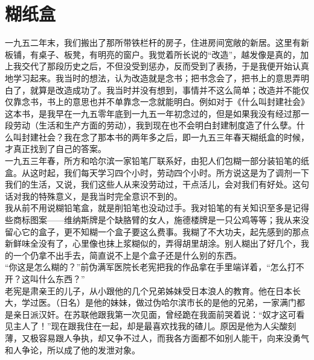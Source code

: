 \fancyhead[RO]{} %
\fancyhead[LE]{} %
\chapter*{糊纸盒}
\thispagestyle{empty}
一九五二年末，我们搬出了那所带铁栏杆的房子，住进房间宽敞的新居。这里有新板铺，有桌子、板凳，有明亮的窗户。我觉着所长说的“改造”，越发像是真的，加上我交代了那段历史之后，不但没受到惩办，反而受到了表扬，于是我便开始认真地学习起来。我当时的想法，认为改造就是念书；把书念会了，把书上的意思弄明白了，就算是改造成功了。我当时并没有想到，事情并不这么简单；改造并不能仅仅靠念书，书上的意思也并不单靠念一念就能明白。例如对于《什么叫封建社会》这本书，是我早在一九五零年底到一九五一年初念过的，但是如果我没有经过那一段劳动（生活和生产方面的劳动），我到现在也不会明白封建制度造了什么孽。什么叫封建社会？我在念了那本书的两年多之后，即一九五三年春天糊纸盒的时候，才真正找到了自己的答案。\\

一九五三年春，所方和哈尔滨一家铅笔厂联系好，由犯人们包糊一部分装铅笔的纸盒。从这时起，我们每天学习四个小时，劳动四个小时。所方说这是为了调剂一下我们的生活，又说，我们这些人从来没劳动过，干点活儿，会对我们有好处。这句话对我的特殊意义，是我当时完全意识不到的。\\

我从前不用说糊铅笔盒，就是削铅笔也没动过手。我对铅笔的有关知识至多是记得些商标图案——维纳斯牌是个缺胳臂的女人，施德楼牌是一只公鸡等等；我从来没留心它的盒子，更不知糊一个盒子要这么费事。我糊了不大功夫，起先感到的那点新鲜味全没有了，心里像也抹上浆糊似的，弄得胡里胡涂。别人糊出了好几个，我的一个仍拿不出手去，简直说不上是个盒子还是什么别的东西。\\

“你这是怎么糊的？”前伪满军医院长老宪把我的作品拿在手里端详着，“怎么打不开？这叫什么东西？”\\

老宪是肃亲王的儿子，从小跟他的几个兄弟姊妹受日本浪人的教育。他在日本长大，学过医。（日名）是他的妹妹，做过伪哈尔滨市长的是他的兄弟，一家满门都是亲日派汉奸。在苏联他跟我第一次见面，曾经跪在我面前哭着说：“奴才这可看见主人了！”现在跟我住在一起，却是最喜欢找我的碴儿。原因是他为人尖酸刻薄，又极容易跟人争执，却又争不过人，而我各方面都不如别人能干，向来没勇气和人争论，所以成了他的发泄对象。\\

